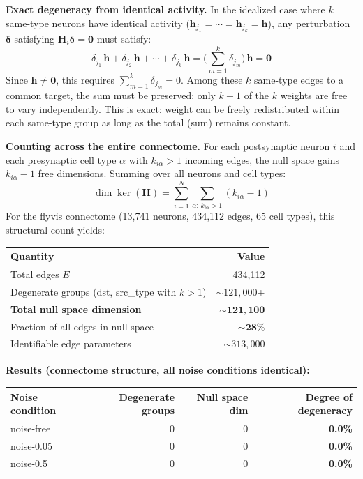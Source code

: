 \documentclass[11pt,a4paper]{article}
\begin{document}
\noindent\textbf{Exact degeneracy from identical activity.} In the idealized case where $k$ same-type neurons have identical activity ($\mathbf{h}_{j_1} = \cdots = \mathbf{h}_{j_k} = \mathbf{h}$), any perturbation $\boldsymbol{\delta}$ satisfying $\mathbf{H}_i \boldsymbol{\delta} = \mathbf{0}$ must satisfy:
\begin{equation}
\delta_{j_1}\, \mathbf{h} + \delta_{j_2}\, \mathbf{h} + \cdots + \delta_{j_k}\, \mathbf{h}
= \Big(\sum_{m=1}^{k} \delta_{j_m}\Big)\, \mathbf{h} = \mathbf{0}
\end{equation}
Since $\mathbf{h} \neq \mathbf{0}$, this requires $\sum_{m=1}^{k} \delta_{j_m} = 0$. Among these $k$ same-type edges to a common target, the sum must be preserved: only $k - 1$ of the $k$ weights are free to vary independently. This is exact: weight can be freely redistributed within each same-type group as long as the total (sum) remains constant.

\noindent\textbf{Counting across the entire connectome.} For each postsynaptic neuron $i$ and each presynaptic cell type $\alpha$ with $k_{i\alpha} > 1$ incoming edges, the null space gains $k_{i\alpha} - 1$ free dimensions. Summing over all neurons and cell types:
\begin{equation}
\dim\ker(\mathbf{H}) = \sum_{i=1}^{N} \sum_{\alpha:\, k_{i\alpha}>1} (k_{i\alpha} - 1)
\end{equation}
For the flyvis connectome (13,741 neurons, 434,112 edges, 65 cell types), this structural count yields:

\begin{center}
\begin{tabular}{lr}
\toprule
Quantity & Value \\
\midrule
Total edges $E$ & 434,112 \\
Degenerate groups (dst, src\_type with $k > 1$) & ${\sim}121{,}000$+ \\
\textbf{Total null space dimension} & $\mathbf{\sim 121{,}100}$ \\
Fraction of all edges in null space & $\mathbf{\sim 28\%}$ \\
Identifiable edge parameters & ${\sim}313{,}000$ \\
\bottomrule
\end{tabular}
\end{center}

\noindent\textbf{Results (connectome structure, all noise conditions identical):}

\begin{center}
\begin{tabular}{lrrr}
\toprule
Noise condition & Degenerate groups & Null space dim & \textbf{Degree of degeneracy} \\
\midrule
noise-free & 0 & 0 & \textbf{0.0\%} \\
noise-0.05 & 0 & 0 & \textbf{0.0\%} \\
noise-0.5 & 0 & 0 & \textbf{0.0\%} \\
\bottomrule
\end{tabular}
\end{center}
\end{document}
